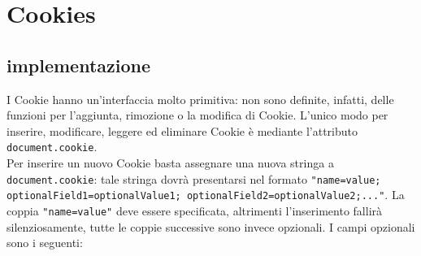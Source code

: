 \documentclass[a4paper, 12pt, twoside, openright]{book}
\begin{document}
\section{Cookies} %
\subsection{implementazione}
I Cookie hanno un'interfaccia molto primitiva: non sono definite, infatti, delle funzioni per l'aggiunta, rimozione o la modifica di Cookie. L'unico modo per inserire, modificare, leggere ed eliminare Cookie è mediante l'attributo \texttt{document.cookie}\cite{MDN_Web_docs:cookies}.\\
Per inserire un nuovo Cookie basta assegnare una nuova stringa a \linebreak\texttt{document.cookie}\cite{MDN_Web_docs:cookies}: tale stringa dovrà presentarsi nel formato \linebreak\texttt{"name=value; optionalField1=optionalValue1; optionalField2=\linebreak optionalValue2;..."}\cite{MDN_Web_docs:cookies}. La coppia \texttt{"name=value"} deve essere specificata, altrimenti l'inserimento fallirà silenziosamente, tutte le coppie successive sono invece opzionali. I campi opzionali sono i seguenti:
\end{document}
